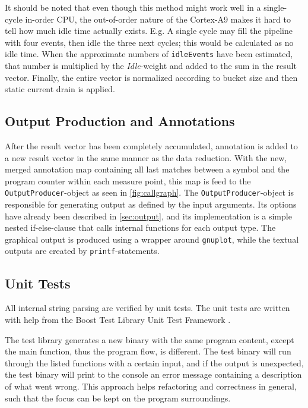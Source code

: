 It should be noted that even though this method might work well in a
single-cycle in-order CPU, the out-of-order nature of the Cortex-A9 makes it
hard to tell how much idle time actually exists. E.g. A single cycle may fill
the pipeline with four events, then idle the three next cycles; this would be
calculated as no idle time. When the approximate numbers of \texttt{idleEvents} have been
estimated, that number is multiplied by the \emph{Idle}-weight and added to the
sum in the result vector. Finally, the entire vector is normalized according to
bucket size and then static current drain is applied.


\subsection{Output Production and Annotations}

After the result vector has been completely accumulated, annotation
is added to a new result vector in the same manner as the data reduction.
With the new, merged annotation map containing all last matches between
a symbol and the program counter within each measure point, this map
is feed to the \texttt{OutputProducer}-object as seen in \autoref{fig:callgraph}.
The \texttt{OutputProducer}-object is responsible for generating output as defined
by the input arguments. Its options have already been described in \autoref{sec:output},
and its implementation is a simple nested if-else-clause that calls internal functions for
each output type. The graphical output is produced using a wrapper around
\texttt{gnuplot}, while the textual outputs are created by
\texttt{printf}-statements.


\subsection{Unit Tests}

All internal string parsing are verified by unit tests. The unit tests
are written with help from the Boost Test Library Unit Test Framework \cite{boostunittest}.

The test library generates a new binary with the same program content, except the
main function, thus the program flow, is different. The test binary will
run through the listed functions with a certain input, and if the output is unexpected,
the test binary will print to the console an error message containing a description of what
went wrong. This approach helps refactoring and correctness in general, such that
the focus can be kept on the program surroundings.


